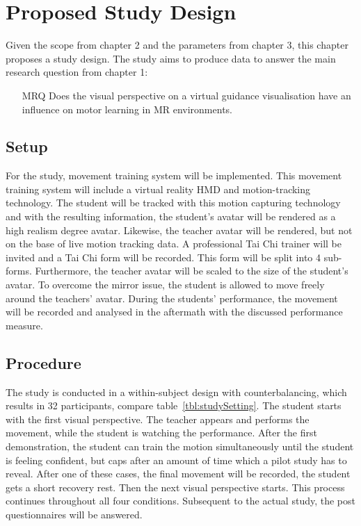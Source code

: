 \chapter{Proposed Study Design}
Given the scope from chapter 2 and the parameters from chapter 3, this chapter proposes a study design. The study aims to produce data to answer the main research question from chapter 1:
\begin{itemize}
	\item[MRQ] Does the visual perspective on a virtual guidance visualisation have an influence on motor learning in MR environments.
\end{itemize}

\section{Setup}
For the study, movement training system will be implemented. This movement training system will include a virtual reality HMD and motion-tracking technology. The student will be tracked with this motion capturing technology and with the resulting information, the student's avatar will be rendered as a high realism degree avatar. Likewise, the teacher avatar will be rendered, but not on the base of live motion tracking data. A professional Tai Chi trainer will be invited and a Tai Chi form will be recorded. This form will be split into 4 sub-forms. Furthermore, the teacher avatar will be scaled to the size of the student's avatar. To overcome the mirror issue, the student is allowed to move freely around the teachers' avatar. During the students' performance, the movement will be recorded and analysed in the aftermath with the discussed performance measure. 

\section{Procedure}
The study is conducted in a within-subject design with counterbalancing, which results in 32 participants, compare table~\ref{tbl:studySetting}. The student starts with the first visual perspective. The teacher appears and performs the movement, while the student is watching the performance. After the first demonstration, the student can train the motion simultaneously until the student is feeling confident, but caps after an amount of time which a pilot study has to reveal. After one of these cases, the final movement will be recorded, the student gets a short recovery rest. Then the next visual perspective starts. This process continues throughout all four conditions. Subsequent to the actual study, the post questionnaires will be answered.

